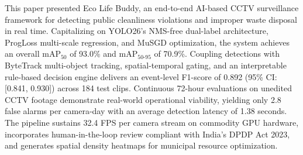 \documentclass[conference]{IEEEtran}
\begin{document}
This paper presented Eco Life Buddy, an end-to-end AI-based CCTV surveillance framework for detecting public cleanliness violations and improper waste disposal in real time. Capitalizing on YOLO26's NMS-free dual-label architecture, ProgLoss multi-scale regression, and MuSGD optimization, the system achieves an overall $\text{mAP}_{50}$ of 93.0\% and $\text{mAP}_{50\text{-}95}$ of 70.9\%. Coupling detections with ByteTrack multi-object tracking, spatial-temporal gating, and an interpretable rule-based decision engine delivers an event-level F1-score of 0.892 (95\% CI: [0.841, 0.930]) across 184 test clips. Continuous 72-hour evaluations on unedited CCTV footage demonstrate real-world operational viability, yielding only 2.8 false alarms per camera-day with an average detection latency of 1.38 seconds. The pipeline sustains 32.4 FPS per camera stream on commodity GPU hardware, incorporates human-in-the-loop review compliant with India's DPDP Act 2023, and generates spatial density heatmaps for municipal resource optimization.
\end{document}

